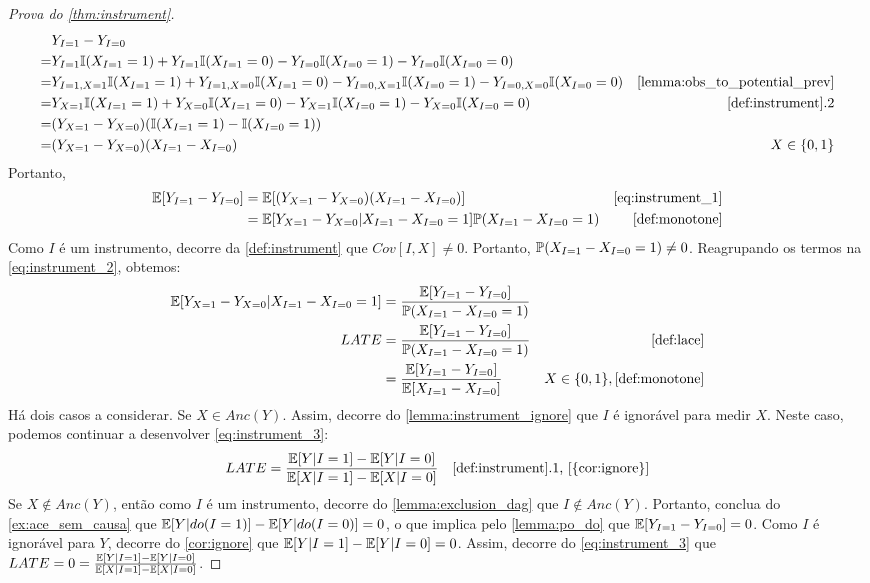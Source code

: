 \begin{proof}[Prova do \cref{thm:instrument}]
 \begin{align}
  \label{eq:instrument_1}
  & Y_{I=1} - Y_{I=0} 
  \nonumber \\
  =& Y_{I=1}\I(X_{I=1}=1) + Y_{I=1}\I(X_{I=1}=0)
  -Y_{I=0}\I(X_{I=0} =1) -Y_{I=0}\I(X_{I=0}=0) 
  \nonumber \\
  =& Y_{I=1,X=1}\I(X_{I=1}=1) + Y_{I=1,X=0}\I(X_{I=1}=0)
  -Y_{I=0,X=1}\I(X_{I=0} =1) -Y_{I=0,X=0}\I(X_{I=0}=0) 
  & \text{\cref{lemma:obs_to_potential_prev}} 
  \nonumber \\
  =& Y_{X=1}\I(X_{I=1}=1) + Y_{X=0}\I(X_{I=1}=0)
  -Y_{X=1}\I(X_{I=0} =1) -Y_{X=0}\I(X_{I=0}=0)
  & \text{\cref{def:instrument}.2} 
  \nonumber \\
  =& (Y_{X=1}-Y_{X=0})(\I(X_{I=1}=1)-\I(X_{I=0} =1)) 
  \nonumber \\
  =& (Y_{X=1}-Y_{X=0})(X_{I=1}-X_{I=0})
   & X \in \{0,1\}
 \end{align}
 Portanto,
 \begin{align}
  \label{eq:instrument_2}
  \E[Y_{I=1} - Y_{I=0}]
  &= \E[(Y_{X=1}-Y_{X=0})(X_{I=1}-X_{I=0})] 
  & \text{\cref{eq:instrument_1}} 
  \nonumber \\
  &= \E[Y_{X=1}-Y_{X=0}|X_{I=1}-X_{I=0}=1]\P(X_{I=1}-X_{I=0}=1) 
  & \text{\cref{def:monotone}} \\
 \end{align}
 Como $I$ é um instrumento,
 decorre da \cref{def:instrument} que $Cov[I,X] \neq 0$.
 Portanto, $\P(X_{I=1}-X_{I=0}=1) \neq 0$.
 Reagrupando os termos na \cref{eq:instrument_2}, 
 obtemos:
 \begin{align}
  \label{eq:instrument_3}
  \E[Y_{X=1}-Y_{X=0}|X_{I=1}-X_{I=0}=1]
  &= \frac{\E[Y_{I=1} - Y_{I=0}]}{\P(X_{I=1}-X_{I=0}=1)} 
  \nonumber \\
  \LACE
  &= \frac{\E[Y_{I=1} - Y_{I=0}]}{\P(X_{I=1}-X_{I=0}=1)}
  & \text{\cref{def:lace}} \\
  &= \frac{\E[Y_{I=1} - Y_{I=0}]}{\E[X_{I=1}-X_{I=0}]}
  & X \in \{0,1\}, \text{\cref{def:monotone}} \\
 \end{align}
 Há dois casos a considerar. 
 Se $X \in Anc(Y)$.
 Assim, decorre do \cref{lemma:instrument_ignore} que
 $I$ é ignorável para medir $X$. Neste caso,
 podemos continuar a desenvolver \cref{eq:instrument_3}:
 \begin{align*}
  \LACE 
  &= \frac{\E[Y|I=1] - \E[Y|I=0]}{\E[X|I=1] - \E[X|I=0]}
  & \text{\cref{def:instrument}.1, \cref{{cor:ignore}}}
 \end{align*}
 Se $X \notin Anc(Y)$, então
 como $I$ é um instrumento,
 decorre do \cref{lemma:exclusion_dag} que
 $I \notin Anc(Y)$. Portanto,
 conclua do \cref{ex:ace_sem_causa} que
 $\E[Y|do(I=1)]-\E[Y|do(I=0)] = 0$, o que implica
 pelo \cref{lemma:po_do} que
 $\E[Y_{I=1}-Y_{I=0}] = 0$.
 Como $I$ é ignorável para $Y$,
 decorre do \cref{cor:ignore} que
 $\E[Y|I=1]-\E[Y|I=0] = 0$.
 Assim, decorre do \cref{eq:instrument_3} que
 $\LACE = 0 = \frac{\E[Y|I=1] - \E[Y|I=0]}{\E[X|I=1] - \E[X|I=0]}$.
\end{proof}


